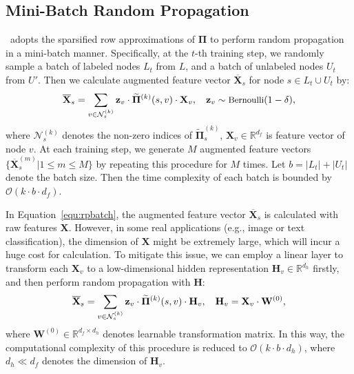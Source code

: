 \subsection{Mini-Batch Random Propagation}
\label{sec:rand_prop}
\model\ adopts the sparsified row approximations of $\mathbf{\Pi}$ to perform random propagation in a mini-batch manner. 
Specifically, at the $t$-th training step, we randomly sample a batch of labeled nodes $L_t$ from $L$, and a batch of unlabeled nodes $U_t$ from $U'$. Then we calculate augmented feature vector $\overline{\mathbf{X}}_s$ for node $s \in L_t \cup U_t$ by:
\begin{equation}
\small
\label{equ:rpbatch}
\overline{\mathbf{X}}_{s} = \sum_{v \in \mathcal{N}^{(k)}_s} \mathbf{z}_v \cdot \widetilde{\mathbf{\Pi}}^{(k)}{(s,v)} \cdot \mathbf{X}_v, \quad \mathbf{z}_v \sim \text{Bernoulli}(1-\delta),
\end{equation}
where $\mathcal{N}^{(k)}_s$ denotes the non-zero indices of $\widetilde{\mathbf{\Pi}}^{(k)}_s$, $\mathbf{X}_v\in \mathbb{R}^{d_f}$ is feature vector of node $v$. At each training step, we generate $M$ augmented feature vectors $\{\overline{\mathbf{X}}^{(m)}_s|1 \leq m \leq M\}$ by repeating this procedure for $M$ times. Let $b = |L_t|+|U_t|$ denote the batch size. Then the time complexity of each batch is bounded by $\mathcal{O}(k \cdot b \cdot d_f)$.

 In Equation~\ref{equ:rpbatch}, the augmented feature vector $\overline{\mathbf{X}}_s$ is calculated with raw features $\mathbf{X}$. However, in some real applications (e.g., image or text classification), the dimension of $\mathbf{X}$ might be extremely large, which will incur a huge cost for calculation.
To mitigate this issue, we can employ a linear layer to transform each $\mathbf{X}_v$ to a low-dimensional hidden representation $\mathbf{H}_v\in \mathbb{R}^{d_h}$ firstly, and then perform random propagation with $\mathbf{H}$:
\begin{equation}
\small
\label{equ:high}
    \overline{\mathbf{X}}_{s} = \sum_{v \in \mathcal{N}^{(k)}_s} \mathbf{z}_v \cdot \widetilde{\mathbf{\Pi}}^{(k)}{(s,v)} \cdot   \mathbf{H}_v, \quad \mathbf{H}_v = \mathbf{X}_v\cdot \mathbf{W}^{(0)},
\end{equation}
where $\mathbf{W}^{(0)}\in \mathbb{R}^{d_f \times d_h}$ denotes learnable transformation matrix. In this way, the computational complexity of this procedure is reduced to $\mathcal{O}(k \cdot b \cdot d_h)$, where $d_h \ll d_f$ denotes the dimension of $\mathbf{H}_v$. 






